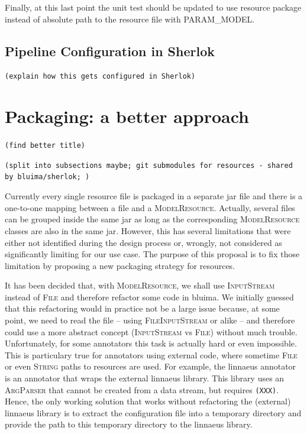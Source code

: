 \documentclass{article}
\newcommand{\id}[1]{\mbox{\textsc{#1}}}
\newcommand{\TODO}[1]{\texttt{\textcolor{YellowOrange}{(#1)}}} %
\begin{document}
Finally, at this last point the unit test should be updated to use resource package instead of absolute path to the resource file with \id{PARAM\_MODEL}.

\subsection{Pipeline Configuration in Sherlok}

\TODO{explain how this gets configured in Sherlok}

\section{Packaging: a better approach}

\TODO{find better title}

\TODO{split into subsections maybe; git submodules for resources - shared by bluima/sherlok; }

Currently every single resource file is packaged in a separate jar file and there is a one-to-one mapping between a file and a \id{ModelResource}. Actually, several files can be grouped inside the same jar as long as the corresponding \id{ModelResource} classes are also in the same jar. However, this has several limitations that were either not identified during the design process or, wrongly, not considered as significantly limiting for our use case. The purpose of this proposal is to fix those limitation by proposing a new packaging strategy for resources.

It has been decided that, with \id{ModelResource}, we shall use \id{InputStream} instead of \id{File} and therefore refactor some code in bluima. We initially guessed that this refactoring would in practice not be a large issue because, at some point, we need to read the file -- using \id{FileInputStream} or alike -- and therefore could use a more abstract concept (\id{InputStream} vs \id{File}) without much trouble. Unfortunately, for some annotators this task is actually hard or even impossible. This is particulary true for annotators using external code, where sometime \id{File} or even \id{String} paths to resources are used. For example, the linnaeus annotator is an annotator that wraps the external linnaeus library. This library uses an \id{ArgParser} that cannot be created from a data stream, but requires \TODO{XXX}. Hence, the only working solution that works without refactoring the (external) linnaeus library is to extract the configuration file into a temporary directory and provide the path to this temporary directory to the linnaeus library.
\end{document}
